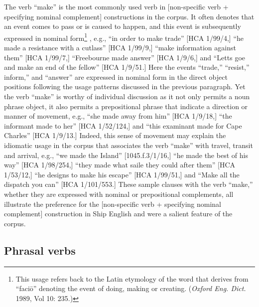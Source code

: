 The verb “make” is the most commonly used verb in [non-specific verb + specifying nominal complement] constructions in the corpus. It often denotes that an event comes to pass or is caused to happen, and this event is subsequently expressed in nominal form\footnote{This usage refers back to the Latin etymology of the word that derives from “{faciō}” denoting the event of doing, making or creating. (\textit{Oxford Eng. Dict.} 1989, Vol 10: 235.)} , e.g., “in order to make trade” [HCA 1/99/4,] “he made a resistance with a cutlass” [HCA 1/99/9,] “make information against them” [HCA 1/99/7,] “Freebourne made answer” [HCA 1/9/6,] and “Letts goe and make an end of the fellow” [HCA 1/9/51.] Here the events “trade,” “resist,” inform,” and “answer” are expressed in nominal form in the direct object positions following the usage patterns discussed in the previous paragraph. Yet the verb “make” is worthy of individual discussion as it not only permits a noun phrase object, it also permits a prepositional phrase that indicate a direction or manner of movement, e.g., “she made away from him” [HCA 1/9/18,] “the informant made to her” [HCA 1/52/124,] and “this examinant made for Cape Charles” [HCA 1/9/13.] Indeed, this sense of movement may explain the idiomatic usage in the corpus that associates the verb “make” with travel, transit and arrival, e.g., “we made the Island” [1045.f.3/1/16,] “he made the best of his way” [HCA 1/98/254,] “they made what saile they could after them” [HCA 1/53/12,] “he designs to make his escape” [HCA 1/99/51,] and “Make all the dispatch you can” [HCA 1/101/553.] These sample clauses with the verb “make,” whether they are expressed with nominal or prepositional complements, all illustrate the preference for the [non-specific verb + specifying nominal complement] construction in Ship English and were a salient feature of the corpus. 

\subsection{{Phrasal} {verbs}}%

